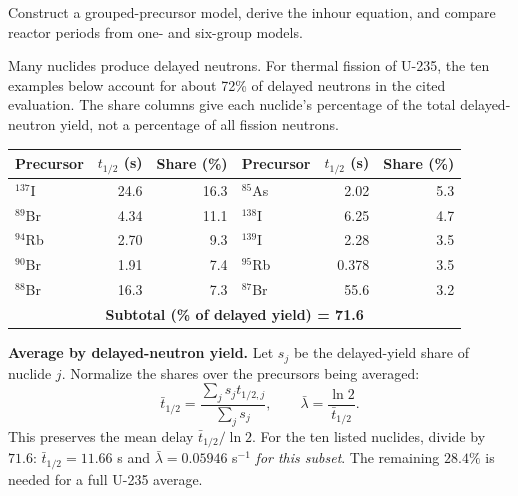 \documentclass[compact]{ne630handout}
\begin{document}
{Construct a grouped-precursor model, derive the inhour equation,
and compare reactor periods from one- and six-group models.}

\begin{handoutflow}

Many nuclides produce delayed neutrons. For thermal fission of U-235,
the ten examples below account for about 72\% of delayed neutrons
in the cited evaluation.
The share columns give each nuclide's percentage of the total delayed-neutron
yield, not a percentage of all fission neutrons.

\begin{center}
{\fontsize{8}{9.5}\selectfont
\begin{tabular}{lrr@{\hspace{1.5em}}lrr}
\toprule
\textbf{Precursor} & $t_{1/2}$ (s) & \textbf{Share (\%)}
& \textbf{Precursor} & $t_{1/2}$ (s) & \textbf{Share (\%)} \\
\midrule
$^{137}$I & 24.6 & 16.3 & $^{85}$As & 2.02 & 5.3 \\
$^{89}$Br & 4.34 & 11.1 & $^{138}$I & 6.25 & 4.7 \\
$^{94}$Rb & 2.70 & 9.3 & $^{139}$I & 2.28 & 3.5 \\
$^{90}$Br & 1.91 & 7.4 & $^{95}$Rb & 0.378 & 3.5 \\
$^{88}$Br & 16.3 & 7.3 & $^{87}$Br & 55.6 & 3.2 \\
\midrule
\multicolumn{6}{c}{\textbf{Subtotal (\% of delayed yield) = 71.6}}  \\
\bottomrule
\end{tabular}
}
\end{center}

\vspace{5pt}

\textbf{Average by delayed-neutron yield.} Let $s_j$ be the delayed-yield
share of nuclide $j$. Normalize the shares over the precursors being averaged:
\[
 \boxed{\bar{t}_{1/2}=\frac{\sum_j s_j t_{1/2,j}}{\sum_j s_j},\qquad
 \bar{\lambda}=\frac{\ln2}{\bar{t}_{1/2}}.}
\]
This preserves the mean delay $\bar{t}_{1/2}/\ln2$.
For the ten listed nuclides, divide by $71.6$: $\bar{t}_{1/2}=11.66$ s
and $\bar{\lambda}=0.05946$ s$^{-1}$ \emph{for this subset}.
The remaining $28.4\%$ is needed for a full U-235 average.


\end{handoutflow}
\end{document}
